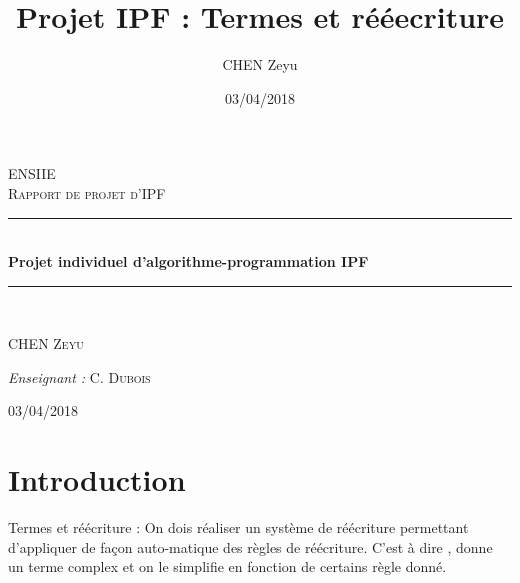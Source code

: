 \documentclass[12pt]{amsart}
\title{ Projet IPF :  Termes et rééecriture  }
\author{CHEN Zeyu}
\date{03/04/2018}
\newcommand{\HRule}{\rule{\linewidth}{0.5mm}}
\begin{document}
	\begin{titlepage}
		\begin{sffamily}
			\begin{center}

				\textsc{\LARGE ENSIIE}\\[2cm]
				\textsc{\Large Rapport de projet d'IPF}\\[1.5cm]
				\HRule \\[0.4cm]
				{ \huge \bfseries Projet individuel d'algorithme-programmation IPF\\[0.4cm] }
				\HRule \\[2cm]

				\begin{minipage}{0.4\textwidth}
				\begin{flushleft} \large
					CHEN \textsc{Zeyu}\\
				\end{flushleft}
				\end{minipage}
				\begin{minipage}{0.4\textwidth}
				\begin{flushright} \large
					\emph{Enseignant :} C. \textsc{Dubois}\\
				\end{flushright}
				\end{minipage}

				\vfill
				{\large 03/04/2018}
			\end{center}
		\end{sffamily}
	\end{titlepage}


\maketitle

\tableofcontents 
 

\section{Introduction} 

		\begin{addmargin}[2em]{0em}
		\label{problem}{
			Termes et réécriture : On dois réaliser un système de réécriture permettant 					d’appliquer de façon auto-matique des règles de réécriture. C'est à dire , donne un 			terme complex et on le simplifie en fonction de certains règle donné.
			
			}
	       \end{addmargin}
\newpage
\end{document}
